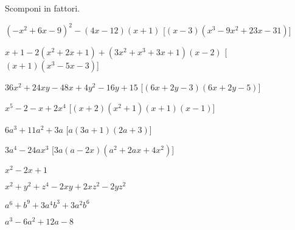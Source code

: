 
\begin{esercizio}[\Ast]
 \label{ese:17.28}
 Scomponi in fattori.
 \begin{enumeratea}
\item \((-x^{2}+6x-9)^{2}-(4x-12)(x+1)\)
  \hfill [\((x-3)(x^{3}-9x^{2}+23x-31)\)]
\item \(x+1-2(x^{2}+2x+1)+(3x^{2}+x^{3}+3x+1)(x-2)\)
  \hfill [\((x+1)(x^{3}-5x-3)\)]
\item \(36x^{2}+24xy-48x+4y^{2}-16y+15\)
  \hfill [\((6x+2y-3)(6x+2y-5)\)]
\item \(x^{5}-2-x+2x^{4}\)
  \hfill [\((x+2)\left(x^{2}+1\right)(x+1)(x-1)\)]
\item \(6a^{3}+11a^{2}+3a\)
  \hfill [\(a(3a+1)(2a+3)\)]
\item \(3a^{4}-24ax^{3}\)
  \hfill [\(3a(a-2x)\left(a^{2}+2ax+4x^{2}\right)\)]
\item \(x^{2}-2x+1\)
  \hfill 
\item \(x^{2}+y^{2}+z^{4}-2xy+2{xz}^{2}-2{yz}^{2}\)
  \hfill 
\item \(a^{6}+b^{9}+3a^{4}b^{3}+3a^{2}b^{6}\)
  \hfill 
\item \(a^{3}-6a^{2}+12a-8\)
  \hfill 
 \end{enumeratea}
\end{esercizio}

